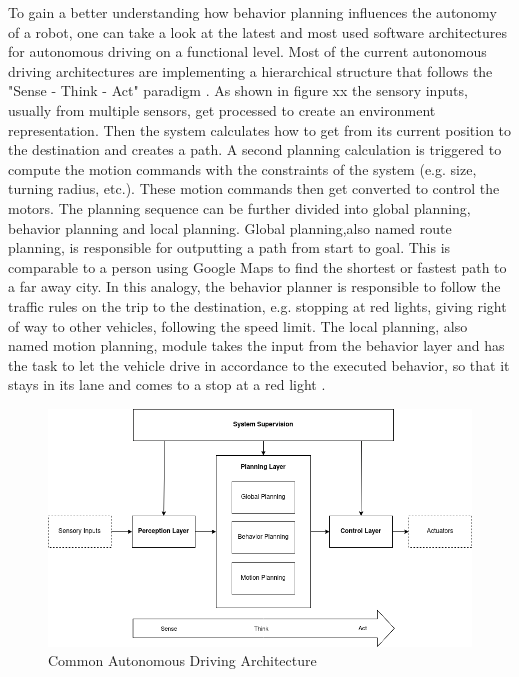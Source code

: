 To gain a better understanding how behavior planning influences the autonomy of a robot, one can take a look at the latest and most used software architectures for autonomous driving on a functional level. 
Most of the current autonomous driving architectures are implementing a hierarchical structure that follows the "Sense - Think - Act" paradigm \cite{murphy2000}. As shown in figure xx the sensory inputs, usually from multiple sensors, get processed to create an environment representation. Then the system calculates how to get from its current position to the destination and creates a path. A second planning calculation is triggered to compute the motion commands with the constraints of the system (e.g. size, turning radius, etc.). These motion commands then get converted to control the motors. 
The planning sequence can be further divided into global planning, behavior planning and local planning. Global planning,also named route planning, is responsible for outputting a path from start to goal. This is comparable to a person using Google Maps to find the shortest or fastest path to a far away city. In this analogy, the behavior planner is responsible to follow the traffic rules on the trip to the destination, e.g. stopping at red lights, giving right of way to other vehicles, following the speed limit. The local planning, also named motion planning, module takes the input from the behavior layer and has the task to let the vehicle drive in accordance to the executed behavior, so that it stays in its lane and comes to a stop at a red light \cite{reke2020}. \\
\begin{figure}
	\includegraphics[width=1.0\textwidth]{images/autonomous_driving_architecture.png}
	\caption{Common Autonomous Driving Architecture \cite{brooks1986} \cite{velasco2020}  }
\end{figure}
 \\


